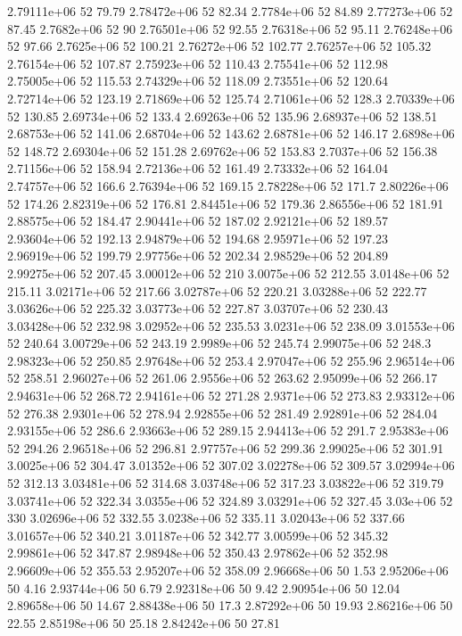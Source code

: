 2.79111e+06 52 79.79
2.78472e+06 52 82.34
2.7784e+06 52 84.89
2.77273e+06 52 87.45
2.7682e+06 52 90
2.76501e+06 52 92.55
2.76318e+06 52 95.11
2.76248e+06 52 97.66
2.7625e+06 52 100.21
2.76272e+06 52 102.77
2.76257e+06 52 105.32
2.76154e+06 52 107.87
2.75923e+06 52 110.43
2.75541e+06 52 112.98
2.75005e+06 52 115.53
2.74329e+06 52 118.09
2.73551e+06 52 120.64
2.72714e+06 52 123.19
2.71869e+06 52 125.74
2.71061e+06 52 128.3
2.70339e+06 52 130.85
2.69734e+06 52 133.4
2.69263e+06 52 135.96
2.68937e+06 52 138.51
2.68753e+06 52 141.06
2.68704e+06 52 143.62
2.68781e+06 52 146.17
2.6898e+06 52 148.72
2.69304e+06 52 151.28
2.69762e+06 52 153.83
2.7037e+06 52 156.38
2.71156e+06 52 158.94
2.72136e+06 52 161.49
2.73332e+06 52 164.04
2.74757e+06 52 166.6
2.76394e+06 52 169.15
2.78228e+06 52 171.7
2.80226e+06 52 174.26
2.82319e+06 52 176.81
2.84451e+06 52 179.36
2.86556e+06 52 181.91
2.88575e+06 52 184.47
2.90441e+06 52 187.02
2.92121e+06 52 189.57
2.93604e+06 52 192.13
2.94879e+06 52 194.68
2.95971e+06 52 197.23
2.96919e+06 52 199.79
2.97756e+06 52 202.34
2.98529e+06 52 204.89
2.99275e+06 52 207.45
3.00012e+06 52 210
3.0075e+06 52 212.55
3.0148e+06 52 215.11
3.02171e+06 52 217.66
3.02787e+06 52 220.21
3.03288e+06 52 222.77
3.03626e+06 52 225.32
3.03773e+06 52 227.87
3.03707e+06 52 230.43
3.03428e+06 52 232.98
3.02952e+06 52 235.53
3.0231e+06 52 238.09
3.01553e+06 52 240.64
3.00729e+06 52 243.19
2.9989e+06 52 245.74
2.99075e+06 52 248.3
2.98323e+06 52 250.85
2.97648e+06 52 253.4
2.97047e+06 52 255.96
2.96514e+06 52 258.51
2.96027e+06 52 261.06
2.9556e+06 52 263.62
2.95099e+06 52 266.17
2.94631e+06 52 268.72
2.94161e+06 52 271.28
2.9371e+06 52 273.83
2.93312e+06 52 276.38
2.9301e+06 52 278.94
2.92855e+06 52 281.49
2.92891e+06 52 284.04
2.93155e+06 52 286.6
2.93663e+06 52 289.15
2.94413e+06 52 291.7
2.95383e+06 52 294.26
2.96518e+06 52 296.81
2.97757e+06 52 299.36
2.99025e+06 52 301.91
3.0025e+06 52 304.47
3.01352e+06 52 307.02
3.02278e+06 52 309.57
3.02994e+06 52 312.13
3.03481e+06 52 314.68
3.03748e+06 52 317.23
3.03822e+06 52 319.79
3.03741e+06 52 322.34
3.0355e+06 52 324.89
3.03291e+06 52 327.45
3.03e+06 52 330
3.02696e+06 52 332.55
3.0238e+06 52 335.11
3.02043e+06 52 337.66
3.01657e+06 52 340.21
3.01187e+06 52 342.77
3.00599e+06 52 345.32
2.99861e+06 52 347.87
2.98948e+06 52 350.43
2.97862e+06 52 352.98
2.96609e+06 52 355.53
2.95207e+06 52 358.09
2.96668e+06 50 1.53
2.95206e+06 50 4.16
2.93744e+06 50 6.79
2.92318e+06 50 9.42
2.90954e+06 50 12.04
2.89658e+06 50 14.67
2.88438e+06 50 17.3
2.87292e+06 50 19.93
2.86216e+06 50 22.55
2.85198e+06 50 25.18
2.84242e+06 50 27.81
